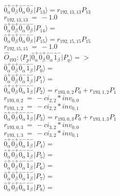\documentclass[14pt]{article}
\begin{document}
    $ \hat{0}_{\alpha}^{+}\hat{0}_{\beta}^{+}\hat{0}_{\alpha}^{-}\hat{0}_{\beta}^{-} \vert{P_{13}}\rangle = {r}_{192,13,13}P_{13} $ \\ 
    ${r}_{192,13,13}\ =\ -1.0 $ \\ 
    $ \hat{0}_{\alpha}^{+}\hat{0}_{\beta}^{+}\hat{0}_{\alpha}^{-}\hat{0}_{\beta}^{-} \vert{P_{14}}\rangle =  $ \\ 
    $ \hat{0}_{\alpha}^{+}\hat{0}_{\beta}^{+}\hat{0}_{\alpha}^{-}\hat{0}_{\beta}^{-} \vert{P_{15}}\rangle = {r}_{192,15,15}P_{15} $ \\ 
    ${r}_{192,15,15}\ =\ -1.0 $ \\ 
    
    $\hat{O}_{193}:  \langle{P_p}\vert \hat{0}_{\alpha}^{+}\hat{0}_{\beta}^{+}\hat{0}_{\alpha}^{-}\hat{1}_{\beta}^{-} \vert{P_q}\rangle => $ \\ 
    $ \hat{0}_{\alpha}^{+}\hat{0}_{\beta}^{+}\hat{0}_{\alpha}^{-}\hat{1}_{\beta}^{-} \vert{P_{0}}\rangle =  $ \\ 
    $ \hat{0}_{\alpha}^{+}\hat{0}_{\beta}^{+}\hat{0}_{\alpha}^{-}\hat{1}_{\beta}^{-} \vert{P_{1}}\rangle =  $ \\ 
    $ \hat{0}_{\alpha}^{+}\hat{0}_{\beta}^{+}\hat{0}_{\alpha}^{-}\hat{1}_{\beta}^{-} \vert{P_{2}}\rangle = {r}_{193,0,2}P_{0}+{r}_{193,1,2}P_{1} $ \\ 
    ${r}_{193,0,2}\ =\ -{ci}_{2,2}*{inv}_{0,0} $ \\ 
    ${r}_{193,1,2}\ =\ -{ci}_{2,2}*{inv}_{0,1} $ \\ 
    $ \hat{0}_{\alpha}^{+}\hat{0}_{\beta}^{+}\hat{0}_{\alpha}^{-}\hat{1}_{\beta}^{-} \vert{P_{3}}\rangle = {r}_{193,0,3}P_{0}+{r}_{193,1,3}P_{1} $ \\ 
    ${r}_{193,0,3}\ =\ -{ci}_{3,2}*{inv}_{0,0} $ \\ 
    ${r}_{193,1,3}\ =\ -{ci}_{3,2}*{inv}_{0,1} $ \\ 
    $ \hat{0}_{\alpha}^{+}\hat{0}_{\beta}^{+}\hat{0}_{\alpha}^{-}\hat{1}_{\beta}^{-} \vert{P_{4}}\rangle =  $ \\ 
    $ \hat{0}_{\alpha}^{+}\hat{0}_{\beta}^{+}\hat{0}_{\alpha}^{-}\hat{1}_{\beta}^{-} \vert{P_{5}}\rangle =  $ \\ 
    $ \hat{0}_{\alpha}^{+}\hat{0}_{\beta}^{+}\hat{0}_{\alpha}^{-}\hat{1}_{\beta}^{-} \vert{P_{6}}\rangle =  $ \\ 
    $ \hat{0}_{\alpha}^{+}\hat{0}_{\beta}^{+}\hat{0}_{\alpha}^{-}\hat{1}_{\beta}^{-} \vert{P_{7}}\rangle =  $ \\ 
    $ \hat{0}_{\alpha}^{+}\hat{0}_{\beta}^{+}\hat{0}_{\alpha}^{-}\hat{1}_{\beta}^{-} \vert{P_{8}}\rangle =  $ \\ 
\end{document}
